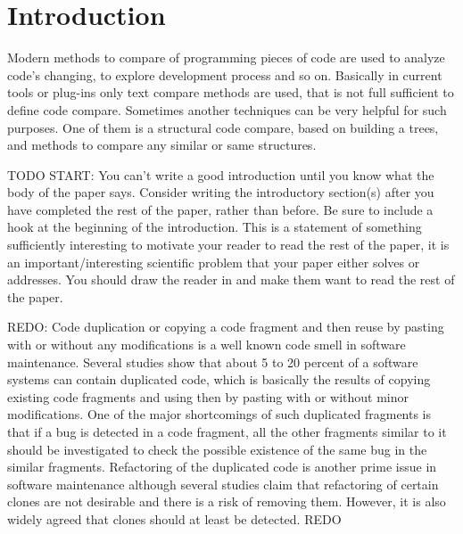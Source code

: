 \documentclass{report}
\begin{document}


\newpage
{}
\doublespacing
\large

\chapter{Introduction}

Modern methods to compare of programming pieces of code are used to analyze code's changing, to explore development process and so on. Basically in current tools or plug-ins only text compare methods are used, that is not full sufficient to define code compare.
Sometimes another techniques can be very helpful for such purposes. One of them is a structural code compare, based on building a trees, and methods to compare any similar or same structures. 

TODO START:
You can't write a good introduction until you know what the body of the paper says. Consider writing the introductory section(s) after you have completed the rest of the paper, rather than before.
Be sure to include a hook at the beginning of the introduction. This is a statement of something sufficiently interesting to motivate your reader to read the rest of the paper, it is an important/interesting scientific problem that your paper either solves or addresses. You should draw the reader in and make them want to read the rest of the paper. 

REDO:
Code duplication or copying a code fragment and then reuse by pasting with or
without any modifications is a well known code smell in software maintenance. Several
studies show that about 5 to 20 percent of a software systems can contain duplicated code,
which is basically the results of copying existing code fragments and using then by
pasting with or without minor modifications. One of the major shortcomings of such
duplicated fragments is that if a bug is detected in a code fragment, all the other
fragments similar to it should be investigated to check the possible existence of the
same bug in the similar fragments. Refactoring of the duplicated code is another prime
issue in software maintenance although several studies claim that refactoring of certain
clones are not desirable and there is a risk of removing them. However, it is also widely
agreed that clones should at least be detected.
REDO
\end{document}
